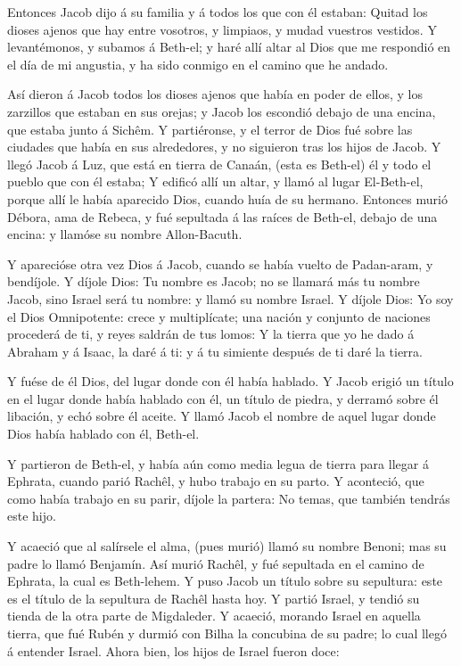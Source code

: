 Entonces Jacob dijo á su familia y á todos los que con él
estaban: Quitad los dioses ajenos que hay entre vosotros, y limpiaos, y
mudad vuestros vestidos.  Y levantémonos, y subamos á
Beth-el; y haré allí altar al Dios que me respondió en el día de mi
angustia, y ha sido conmigo en el camino que he andado.

 Así dieron á Jacob todos los dioses ajenos que había en
poder de ellos, y los zarzillos que estaban en sus orejas; y Jacob los
escondió debajo de una encina, que estaba junto á Sichêm.  Y
partiéronse, y el terror de Dios fué sobre las ciudades que había en sus
alrededores, y no siguieron tras los hijos de Jacob.  Y
llegó Jacob á Luz, que está en tierra de Canaán, (esta es Beth-el) él y
todo el pueblo que con él estaba;  Y edificó allí un altar,
y llamó al lugar El-Beth-el, porque allí le había aparecido Dios, cuando
huía de su hermano.  Entonces murió Débora, ama de Rebeca, y
fué sepultada á las raíces de Beth-el, debajo de una encina: y llamóse
su nombre Allon-Bacuth.

 Y aparecióse otra vez Dios á Jacob, cuando se había vuelto
de Padan-aram, y bendíjole.  Y díjole Dios: Tu nombre es
Jacob; no se llamará más tu nombre Jacob, sino Israel será tu nombre: y
llamó su nombre Israel.  Y díjole Dios: Yo soy el Dios
Omnipotente: crece y multiplícate; una nación y conjunto de naciones
procederá de ti, y reyes saldrán de tus lomos:  Y la tierra
que yo he dado á Abraham y á Isaac, la daré á ti: y á tu simiente
después de ti daré la tierra.

 Y fuése de él Dios, del lugar donde con él había hablado.
 Y Jacob erigió un título en el lugar donde había hablado
con él, un título de piedra, y derramó sobre él libación, y echó sobre
él aceite.  Y llamó Jacob el nombre de aquel lugar donde
Dios había hablado con él, Beth-el.

 Y partieron de Beth-el, y había aún como media legua de
tierra para llegar á Ephrata, cuando parió Rachêl, y hubo trabajo en su
parto.  Y aconteció, que como había trabajo en su parir,
díjole la partera: No temas, que también tendrás este hijo.

 Y acaeció que al salírsele el alma, (pues murió) llamó su
nombre Benoni; mas su padre lo llamó Benjamín.  Así murió
Rachêl, y fué sepultada en el camino de Ephrata, la cual es Beth-lehem.
 Y puso Jacob un título sobre su sepultura: este es el
título de la sepultura de Rachêl hasta hoy.  Y partió
Israel, y tendió su tienda de la otra parte de Migdaleder. 
Y acaeció, morando Israel en aquella tierra, que fué Rubén y durmió con
Bilha la concubina de su padre; lo cual llegó á entender Israel. Ahora
bien, los hijos de Israel fueron doce:

